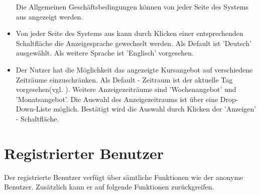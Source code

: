 \documentclass[a4paper]{scrreprt}
\newcounter{Lc}
\newcounter{Hc}
\newcommand{\stepHc}{\stepcounter{Hc}\setcounter{Lc}{0}}
\begin{document}
\begin{itemize}
					Die Allgemeinen Geschäftsbedingungen können von jeder Seite des Systems aus angezeigt werden.
				\item {}
					Von jeder Seite des Systems aus kann durch Klicken einer entsprechenden Schaltfläche die Anzeigesprache gewechselt werden. Als Default ist 'Deutsch' ausgewählt. Als weitere Sprache ist 'Englisch' vorgesehen.
				\item {}
					Der Nutzer hat die Möglichkeit das angezeigte Kursangebot auf verschiedene Zeiträume einzuschränken. Als Default - Zeitraum ist der aktuelle Tag vorgesehen(vgl. ). Weitere Anzeigezeiträume sind 'Wochenangebot' und 'Monatsangebot'. Die Auswahl des Anzeigezeitraums ist über eine Drop-Down-Liste möglich. Bestätigt wird die Auswahl durch Klicken der 'Anzeigen' - Schaltfläche. 
			\end{itemize}

	\section{Registrierter Benutzer}
	Der registrierte Benutzer verfügt über sämtliche Funktionen wie der anonyme Benutzer. Zusätzlich kann er auf folgende Funktionen zurückgreifen.
		\stepHc
\end{document}
